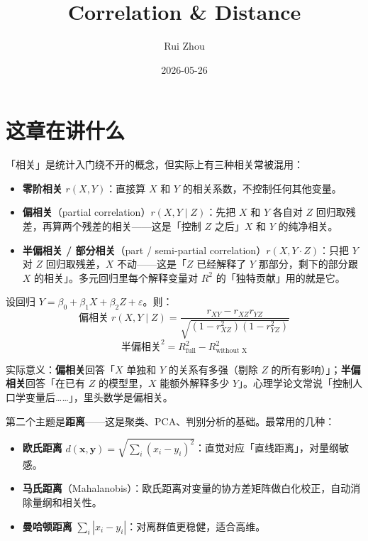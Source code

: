 \documentclass[
]{ctexart}
\title{Correlation \& Distance}
\author{Rui Zhou}
\date{2026-05-26}
\providecommand{\tightlist}{%
  \setlength{\itemsep}{0pt}\setlength{\parskip}{0pt}}
\begin{document}
\maketitle

{
\setcounter{tocdepth}{2}
\tableofcontents
}
\hypertarget{ux8fd9ux7ae0ux5728ux8bb2ux4ec0ux4e48}{%
\section{这章在讲什么}\label{ux8fd9ux7ae0ux5728ux8bb2ux4ec0ux4e48}}

「相关」是统计入门绕不开的概念，但实际上有三种相关常被混用：

\begin{itemize}
\tightlist
\item
  \textbf{零阶相关} \(r(X, Y)\)：直接算 \(X\) 和 \(Y\)
  的相关系数，不控制任何其他变量。
\item
  \textbf{偏相关}（partial correlation）\(r(X, Y \mid Z)\)：先把 \(X\)
  和 \(Y\) 各自对 \(Z\) 回归取残差，再算两个残差的相关------这是「控制
  \(Z\) 之后」\(X\) 和 \(Y\) 的纯净相关。
\item
  \textbf{半偏相关 / 部分相关}（part / semi-partial
  correlation）\(r(X, Y \cdot Z)\)：只把 \(Y\) 对 \(Z\)
  回归取残差，\(X\) 不动------这是「\(Z\) 已经解释了 \(Y\)
  那部分，剩下的部分跟 \(X\) 的相关」。多元回归里每个解释变量对 \(R^2\)
  的「独特贡献」用的就是它。
\end{itemize}

\begin{concept}[三种相关的关系]
设回归 $Y = \beta_0 + \beta_1 X + \beta_2 Z + \varepsilon$。则：
$$\text{偏相关} \; r(X, Y \mid Z) = \frac{r_{XY} - r_{XZ} r_{YZ}}{\sqrt{(1-r_{XZ}^2)(1-r_{YZ}^2)}}$$
$$\text{半偏相关}^2 = R^2_\text{full} - R^2_\text{without X}$$

实际意义：\textbf{偏相关}回答「$X$ 单独和 $Y$ 的关系有多强（剔除 $Z$ 的所有影响）」；\textbf{半偏相关}回答「在已有 $Z$ 的模型里，$X$ 能额外解释多少 $Y$」。心理学论文常说「控制人口学变量后……」，里头数学是偏相关。
\end{concept}

第二个主题是\textbf{距离}------这是聚类、PCA、判别分析的基础。最常用的几种：

\begin{itemize}
\tightlist
\item
  \textbf{欧氏距离}
  \(d(\mathbf{x}, \mathbf{y}) = \sqrt{\sum_i (x_i - y_i)^2}\)：直觉对应「直线距离」，对量纲敏感。
\item
  \textbf{马氏距离}（Mahalanobis）：欧氏距离对变量的协方差矩阵做白化校正，自动消除量纲和相关性。
\item
  \textbf{曼哈顿距离} \(\sum_i |x_i - y_i|\)：对离群值更稳健，适合高维。
\end{itemize}
\end{document}
